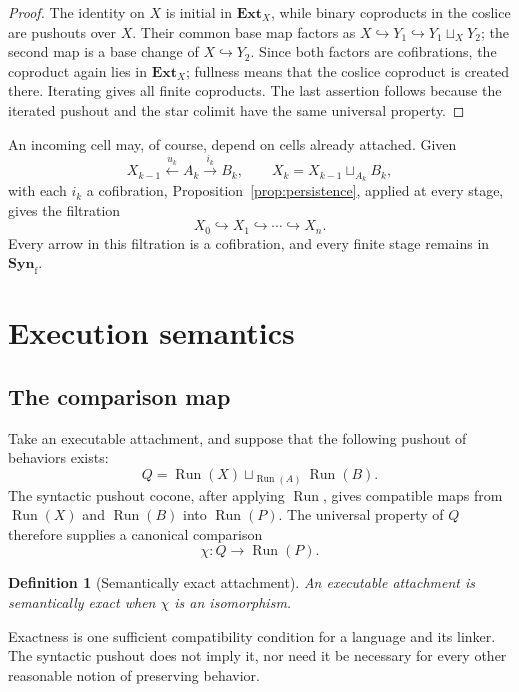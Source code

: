 \documentclass[11pt]{article}
\newtheorem{definition}[theorem]{Definition}
\newcommand{\Syn}{\mathbf{Syn}}
\DeclareMathOperator{\Run}{Run}
\begin{document}
\begin{proof}
The identity on \(X\) is initial in \(\mathbf{Ext}_X\), while binary
coproducts in the coslice are pushouts over \(X\).  Their common base map
factors as
\(X\hookrightarrow Y_1\hookrightarrow Y_1\sqcup_XY_2\); the second map is a
base change of \(X\hookrightarrow Y_2\).  Since both factors are
cofibrations, the coproduct again lies in \(\mathbf{Ext}_X\); fullness means
that the coslice coproduct is created there.  Iterating gives all finite
coproducts.  The last assertion follows because the iterated pushout and the
star colimit have the same universal property.
\end{proof}

An incoming cell may, of course, depend on cells already attached.  Given
\[
 X_{k-1}\xleftarrow{u_k}A_k\xrightarrow{i_k}B_k,
 \qquad
 X_k=X_{k-1}\sqcup_{A_k}B_k,
\]
with each \(i_k\) a cofibration, Proposition~\ref{prop:persistence}, applied
at every stage, gives the filtration
\[
 X_0\hookrightarrow X_1\hookrightarrow\cdots\hookrightarrow X_n.
\]
Every arrow in this filtration is a cofibration, and every finite stage remains
in \(\Syn_{\mathrm f}\).

\section{Execution semantics}

\subsection{The comparison map}

Take an executable attachment, and suppose that the following pushout of
behaviors exists:
\[
 Q=\Run(X)\sqcup_{\Run(A)}\Run(B).
\]
The syntactic pushout cocone, after applying \(\Run\), gives compatible maps
from \(\Run(X)\) and \(\Run(B)\) into \(\Run(P)\).  The universal property of
\(Q\) therefore supplies a canonical comparison
\[
 \chi:Q\longrightarrow\Run(P).
\]

\begin{definition}[Semantically exact attachment]
An executable attachment is \emph{semantically exact} when \(\chi\) is an
isomorphism.
\end{definition}

Exactness is one sufficient compatibility condition for a language and its
linker.  The syntactic pushout does not imply it, nor need it be necessary for
every other reasonable notion of preserving behavior.
\end{document}
